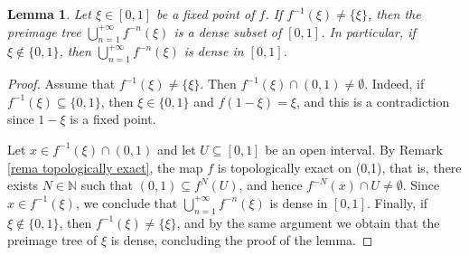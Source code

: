 \documentclass[12pt]{amsart}
\numberwithin{equation}{section} %
\numberwithin{figure}{section} %
\theoremstyle{plain}
\newtheorem{lemm}[prop]{Lemma}
\theoremstyle{definition}
\theoremstyle{remark}
\theoremstyle{citing}
\newcommand{\N}{\mathbb{N}}
\renewcommand{\=}{\coloneqq}
\begin{document}
      \begin{lemm}\label{l: dense preimage tree}
          Let $\xi \in[0,1]$ be a fixed point of $f$. If $f^{-1}(\xi) \neq \{\xi\}$, then the preimage tree $\bigcup_{n=1}^{+\infty}f^{-n}(\xi)$ is a dense subset of $[0,1]$. In particular, if $\xi \not\in\{0,1\}$, then $\bigcup_{n=1}^{+\infty}f^{-n}(\xi)$ is dense in $[0,1]$.
      \end{lemm}
      \begin{proof}
        Assume that $f^{-1}(\xi) \neq \{\xi\}$. Then $f^{-1}(\xi)\cap(0,1)\neq \emptyset$. Indeed, if $f^{-1}(\xi) \subseteq \{0,1\}$, then $\xi \in\{0,1\}$ and $f(1-\xi)=\xi$, and this is a contradiction since $1-\xi$ is a fixed point.

        Let $x\in f^{-1}(\xi)\cap (0,1)$ and let $U\subseteq [0,1]$ be an open interval. By Remark \ref{rema topologically exact}, the map $f$ is topologically exact on (0,1), that is, there exists $N\in\N$ such that $(0,1) \subseteq f^{N}(U)$, and hence $f^{-N}(x)\cap U \neq \emptyset$. Since $x\in f^{-1}(\xi)$, we conclude that $\bigcup_{n=1}^{+\infty}f^{-n}(\xi)$ is dense in $[0,1]$. Finally, if $\xi \not\in \{0,1\}$, then $f^{-1}(\xi)\neq \{\xi\}$, and by the same argument we obtain that the preimage tree of $\xi$ is dense, concluding the proof of the lemma.
      \end{proof}
\end{document}
